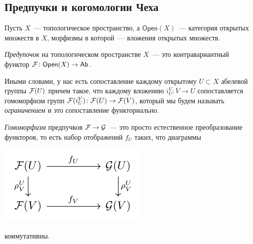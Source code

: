 
	\subsection{Предпучки и когомологии Чеха}

	Пусть $X$~--- топологическое пространство, а $\mathsf{Open}(X)$~--- категория открытых множеств в $X$, морфизмы в которой~--- вложения открытых множеств. 

	\begin{definition} 
		\emph{Предупочок} на топологическом пространстве $X$~--- это контравариантный функтор $\mathcal{F}\colon \mathsf{Open}(X) \to \mathsf{Ab}$. 

		Иными словами, у нас есть сопоставление каждому открытому $U \subset X$ абелевой группы $\mathcal{F}(U)$ причем такое, что каждому вложению $i_{U}^{V} \colon V \to U$ сопоставляется гомоморфизм групп $\mathcal{F}(i_{U}^{V})\colon \mathcal{F}(U) \to \mathcal{F}(V)$, который мы будем называть \emph{ограничением} и это сопоставление функториально. 

		\emph{Гомоморфизм} предпучков $\mathcal{F} \to \mathcal{G}$~--- это просто естественное преобразование функторов, то есть набор отображений $f_{U}$  таких, что диаграммы 
		\begin{center}
			\includegraphics{lectures/7/pictures/cd_39.pdf}
		\end{center}
		коммутативны. 
	\end{definition}

